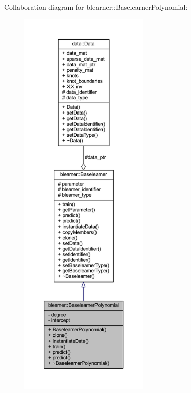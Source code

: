 Collaboration diagram for blearner\+:\+:Baselearner\+Polynomial\+:\nopagebreak
\begin{figure}[H]
\begin{center}
\leavevmode
\includegraphics[height=550pt]{classblearner_1_1_baselearner_polynomial__coll__graph}
\end{center}
\end{figure}
